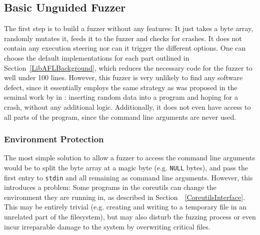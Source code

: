 \documentclass{article}
\newcommand{\code}[1]{\texttt{#1}}
\let\savedRef=\ref
\renewcommand{\ref}{\unskip~\savedRef}
\begin{document}
\begin{multicols}{2}
    \subsection{Basic Unguided Fuzzer}

    The first step is to build a fuzzer without any features: It just takes a byte array, randomly mutates it, feeds it to the fuzzer and checks for crashes. It does not contain any execution steering nor can it trigger the different options. One can choose the default implementations for each part outlined in Section\ref{LibAFLBackground}, which reduces the necessary code for the fuzzer to well under 100 lines. However, this fuzzer is very unlikely to find any software defect, since it essentially employs the same strategy as was proposed in the seminal work by \citeauthor{UNIX} in \citeyear{UNIX}: inserting random data into a program and hoping for a crash, without any additional logic. Additionally, it does not even have access to all parts of the program, since the command line arguments are never used.

    \subsubsection{Environment Protection}
    \label{Environment}

    The most simple solution to allow a fuzzer to access the command line arguments would be to split the byte array at a magic byte (e.g. \code{NULL} bytes), and pass the first entry to \code{stdin} and all remaining as command line arguments. However, this introduces a problem: Some programs in the coreutils can change the environment they are running in, as described in Section~\ref{CoreutilsInterface}. This may be entirely trivial (e.g. creating and writing to a temporary file in an unrelated part of the filesystem), but may also disturb the fuzzing process or even incur irreparable damage to the system by overwriting critical files.


\end{multicols}
\end{document}
